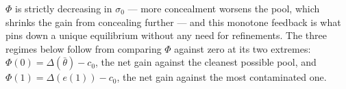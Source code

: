 $\Phi$ is strictly decreasing in $\sigma_0$ --- more concealment worsens the pool, which shrinks the gain from concealing further --- and this monotone feedback is what pins down a unique equilibrium without any need for refinements. The three regimes below follow from comparing $\Phi$ against zero at its two extremes: $\Phi(0)=\Delta(\bar{\theta})-c_0$, the net gain against the cleanest possible pool, and $\Phi(1)=\Delta(e(1))-c_0$, the net gain against the most contaminated one.
